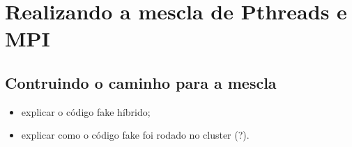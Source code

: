 \section{Realizando a mescla de Pthreads e MPI}
    
    \subsection{Contruindo o caminho para a mescla}
    
	    \begin{itemize}
	    	\item explicar o código fake híbrido;
	    	\item explicar como o código fake foi rodado no cluster (?).
	    \end{itemize}
